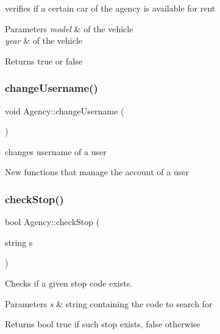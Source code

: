 verifies if a certain car of the agency is available for rent 


\begin{DoxyParams}{Parameters}
{\em model} & of the vehicle \\
\hline
{\em year} & of the vehicle\\
\hline
\end{DoxyParams}
\begin{DoxyReturn}{Returns}
true or false 
\end{DoxyReturn}
\mbox{\label{class_agency_a8a2b0d746484213d43f722c0a0766a66}} 
\subsubsection{\texorpdfstring{change\+Username()}{changeUsername()}}
{\footnotesize\ttfamily void Agency\+::change\+Username (\begin{DoxyParamCaption}{ }\end{DoxyParamCaption})}



changes username of a user 

New functions that manage the account of a user \mbox{\label{class_agency_a5de11a6e7a081abefea2560290d542b6}} 
\subsubsection{\texorpdfstring{check\+Stop()}{checkStop()}}
{\footnotesize\ttfamily bool Agency\+::check\+Stop (\begin{DoxyParamCaption}\item[{string}]{s }\end{DoxyParamCaption})}



Checks if a given stop code exists. 


\begin{DoxyParams}{Parameters}
{\em s} & string containing the code to search for\\
\hline
\end{DoxyParams}
\begin{DoxyReturn}{Returns}
bool true if such stop exists, false otherwise 
\end{DoxyReturn}
\mbox{\label{class_agency_ab93c48db5700b6d02bf81b3cd3af6711}} 
